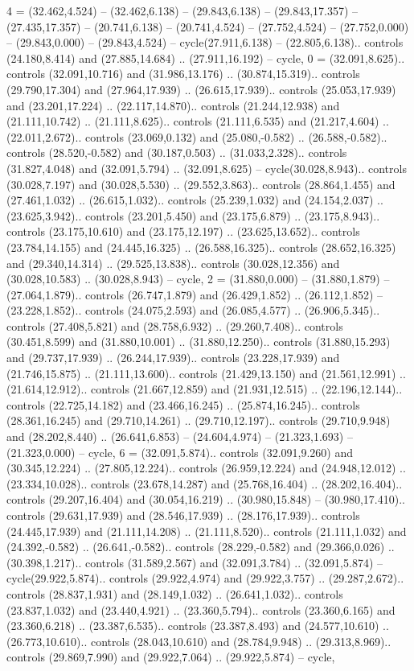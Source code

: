 {4} = {(32.462,4.524) -- (32.462,6.138) -- (29.843,6.138) -- (29.843,17.357) -- (27.435,17.357) -- (20.741,6.138) -- (20.741,4.524) -- (27.752,4.524) -- (27.752,0.000) -- (29.843,0.000) -- (29.843,4.524) -- cycle(27.911,6.138) -- (22.805,6.138).. controls (24.180,8.414) and (27.885,14.684) .. (27.911,16.192) -- cycle},
{0} = {(32.091,8.625).. controls (32.091,10.716) and (31.986,13.176) .. (30.874,15.319).. controls (29.790,17.304) and (27.964,17.939) .. (26.615,17.939).. controls (25.053,17.939) and (23.201,17.224) .. (22.117,14.870).. controls (21.244,12.938) and (21.111,10.742) .. (21.111,8.625).. controls (21.111,6.535) and (21.217,4.604) .. (22.011,2.672).. controls (23.069,0.132) and (25.080,-0.582) .. (26.588,-0.582).. controls (28.520,-0.582) and (30.187,0.503) .. (31.033,2.328).. controls (31.827,4.048) and (32.091,5.794) .. (32.091,8.625) -- cycle(30.028,8.943).. controls (30.028,7.197) and (30.028,5.530) .. (29.552,3.863).. controls (28.864,1.455) and (27.461,1.032) .. (26.615,1.032).. controls (25.239,1.032) and (24.154,2.037) .. (23.625,3.942).. controls (23.201,5.450) and (23.175,6.879) .. (23.175,8.943).. controls (23.175,10.610) and (23.175,12.197) .. (23.625,13.652).. controls (23.784,14.155) and (24.445,16.325) .. (26.588,16.325).. controls (28.652,16.325) and (29.340,14.314) .. (29.525,13.838).. controls (30.028,12.356) and (30.028,10.583) .. (30.028,8.943) -- cycle},
{2} = {(31.880,0.000) -- (31.880,1.879) -- (27.064,1.879).. controls (26.747,1.879) and (26.429,1.852) .. (26.112,1.852) -- (23.228,1.852).. controls (24.075,2.593) and (26.085,4.577) .. (26.906,5.345).. controls (27.408,5.821) and (28.758,6.932) .. (29.260,7.408).. controls (30.451,8.599) and (31.880,10.001) .. (31.880,12.250).. controls (31.880,15.293) and (29.737,17.939) .. (26.244,17.939).. controls (23.228,17.939) and (21.746,15.875) .. (21.111,13.600).. controls (21.429,13.150) and (21.561,12.991) .. (21.614,12.912).. controls (21.667,12.859) and (21.931,12.515) .. (22.196,12.144).. controls (22.725,14.182) and (23.466,16.245) .. (25.874,16.245).. controls (28.361,16.245) and (29.710,14.261) .. (29.710,12.197).. controls (29.710,9.948) and (28.202,8.440) .. (26.641,6.853) -- (24.604,4.974) -- (21.323,1.693) -- (21.323,0.000) -- cycle},
{6} = {(32.091,5.874).. controls (32.091,9.260) and (30.345,12.224) .. (27.805,12.224).. controls (26.959,12.224) and (24.948,12.012) .. (23.334,10.028).. controls (23.678,14.287) and (25.768,16.404) .. (28.202,16.404).. controls (29.207,16.404) and (30.054,16.219) .. (30.980,15.848) -- (30.980,17.410).. controls (29.631,17.939) and (28.546,17.939) .. (28.176,17.939).. controls (24.445,17.939) and (21.111,14.208) .. (21.111,8.520).. controls (21.111,1.032) and (24.392,-0.582) .. (26.641,-0.582).. controls (28.229,-0.582) and (29.366,0.026) .. (30.398,1.217).. controls (31.589,2.567) and (32.091,3.784) .. (32.091,5.874) -- cycle(29.922,5.874).. controls (29.922,4.974) and (29.922,3.757) .. (29.287,2.672).. controls (28.837,1.931) and (28.149,1.032) .. (26.641,1.032).. controls (23.837,1.032) and (23.440,4.921) .. (23.360,5.794).. controls (23.360,6.165) and (23.360,6.218) .. (23.387,6.535).. controls (23.387,8.493) and (24.577,10.610) .. (26.773,10.610).. controls (28.043,10.610) and (28.784,9.948) .. (29.313,8.969).. controls (29.869,7.990) and (29.922,7.064) .. (29.922,5.874) -- cycle},
